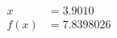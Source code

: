 \documentclass[preview]{standalone}
\begin{document}
\begin{align*}
x &= 3.9010\\f(x) &= 7.8398026
\end{align*}
\end{document}
